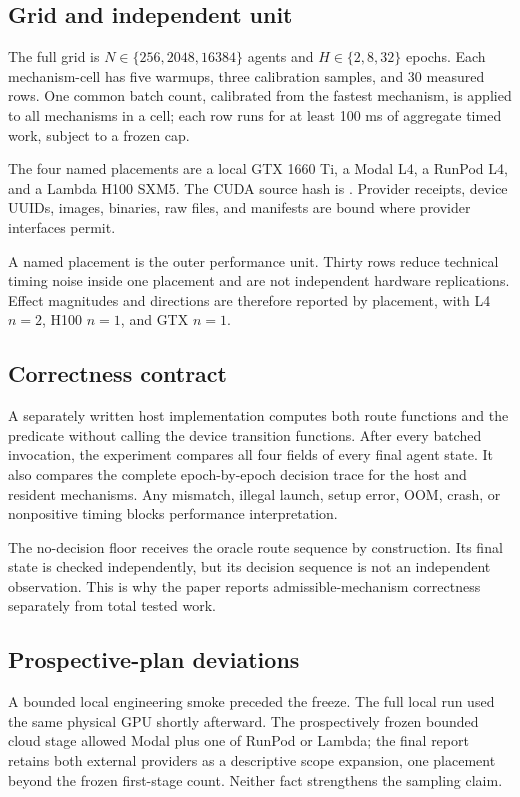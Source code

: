 \subsection{Grid and independent unit}

The full grid is $N\in\{256,2048,16384\}$ agents and
$H\in\{2,8,32\}$ epochs. Each mechanism-cell has five warmups, three
calibration samples, and 30 measured rows. One common batch count, calibrated
from the fastest mechanism, is applied to all mechanisms in a cell; each row
runs for at least 100 ms of aggregate timed work, subject to a frozen cap.

The four named placements are a local GTX 1660 Ti, a Modal L4, a RunPod L4,
and a Lambda H100 SXM5. The CUDA source hash is
.
Provider receipts, device UUIDs, images, binaries, raw files, and manifests are
bound where provider interfaces permit.

A named placement is the outer performance unit. Thirty rows reduce technical
timing noise inside one placement and are not independent hardware
replications. Effect magnitudes and directions are therefore reported by
placement, with L4 $n=2$, H100 $n=1$, and GTX $n=1$.

\subsection{Correctness contract}

A separately written host implementation computes both route functions and
the predicate without calling the device transition functions. After every
batched invocation, the experiment compares all four fields of every final
agent state. It also compares the complete epoch-by-epoch decision trace for
the host and resident mechanisms. Any mismatch, illegal launch, setup error,
OOM, crash, or nonpositive timing blocks performance interpretation.

The no-decision floor receives the oracle route sequence by construction. Its
final state is checked independently, but its decision sequence is not an
independent observation. This is why the paper reports admissible-mechanism
correctness separately from total tested work.

\subsection{Prospective-plan deviations}

A bounded local engineering smoke preceded the freeze. The full local run
used the same physical GPU shortly afterward. The prospectively frozen bounded cloud
stage allowed Modal plus one of RunPod or Lambda; the final report retains both
external providers as a descriptive scope expansion, one placement beyond the
frozen first-stage count. Neither fact strengthens the sampling claim.

